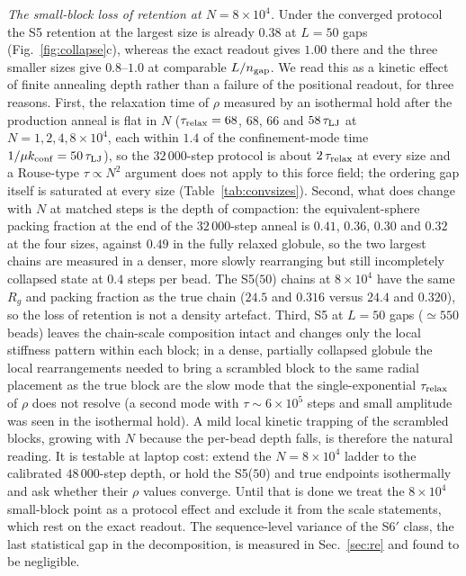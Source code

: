 \documentclass[reprint,amsmath,amssymb,aps,pre,longbibliography]{revtex4-2}
\begin{document}
\emph{The small-block loss of retention at $N=8\times10^{4}$.} Under the converged protocol
the S5 retention at the largest size is already $0.38$ at $L=50$ gaps
(Fig.~\ref{fig:collapse}c), whereas the exact readout gives $1.00$ there and the three
smaller sizes give $0.8$--$1.0$ at comparable $L/n_{\rm gap}$. We read this as a kinetic
effect of finite annealing depth rather than a failure of the positional readout, for three
reasons. First, the relaxation time of $\rho$ measured by an isothermal hold after the
production anneal is flat in $N$ ($\tau_{\rm relax}=68$, $68$, $66$ and $58\,\tau_{\rm LJ}$ at
$N=1,2,4,8\times10^{4}$, each within $1.4$ of the confinement-mode time
$1/\mu k_{\rm conf}=50\,\tau_{\rm LJ}$), so the $32\,000$-step protocol is about
$2\,\tau_{\rm relax}$ at every size and a Rouse-type $\tau\propto N^{2}$ argument does not
apply to this force field; the ordering gap itself is saturated at every size
(Table~\ref{tab:convsizes}). Second, what does change with $N$ at matched steps is the
depth of compaction: the equivalent-sphere packing fraction at the end of the $32\,000$-step
anneal is $0.41$, $0.36$, $0.30$ and $0.32$ at the four sizes, against $0.49$ in the fully
relaxed globule, so the two largest chains are measured in a denser, more slowly
rearranging but still incompletely collapsed state at $0.4$ steps per bead. The S5($50$)
chains at $8\times10^{4}$ have the same $R_g$ and packing fraction as the true chain
($24.5$ and $0.316$ versus $24.4$ and $0.320$), so the loss of retention is not a density
artefact. Third, S5 at $L=50$ gaps ($\simeq550$ beads) leaves the chain-scale composition
intact and changes only the local stiffness pattern within each block; in a dense,
partially collapsed globule the local rearrangements needed to bring a scrambled block to
the same radial placement as the true block are the slow mode that the single-exponential
$\tau_{\rm relax}$ of $\rho$ does not resolve (a second mode with $\tau\sim6\times10^{5}$
steps and small amplitude was seen in the isothermal hold). A mild local kinetic trapping of
the scrambled blocks, growing with $N$ because the per-bead depth falls, is therefore the
natural reading. It is testable at laptop cost: extend the $N=8\times10^{4}$ ladder to the
calibrated $48\,000$-step depth, or hold the S5($50$) and true endpoints isothermally and
ask whether their $\rho$ values converge. Until that is done we treat the $8\times10^{4}$
small-block point as a protocol effect and exclude it from the scale statements, which rest
on the exact readout. The sequence-level variance of the S6$'$ class, the last statistical
gap in the decomposition, is measured in Sec.~\ref{sec:re} and found to be negligible.
\end{document}
